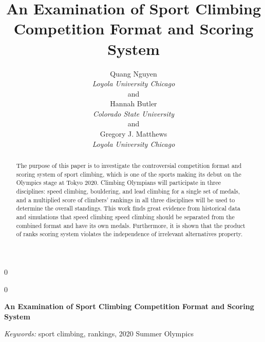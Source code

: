 \documentclass[12pt]{article}
\newcommand{\blind}{0}
\begin{document}
\def\spacingset#1{\renewcommand{\baselinestretch}%
{#1}\small\normalsize} \spacingset{1}



\blind
{
  \title{\bf An Examination of Sport Climbing Competition Format and
Scoring System}

  \author{
        Quang Nguyen \\
    \textit{Loyola University Chicago}\\
     and \\     Hannah Butler \\
    \textit{Colorado State University}\\
     and \\     Gregory J. Matthews \\
    \textit{Loyola University Chicago}\\
      }
  \maketitle
} \fi

\blind
{
  \bigskip
  \bigskip
  \bigskip
  \begin{center}
    {\LARGE\bf An Examination of Sport Climbing Competition Format and
Scoring System}
  \end{center}
  \medskip
} \fi

\bigskip
\begin{abstract}
The purpose of this paper is to investigate the controversial
competition format and scoring system of sport climbing, which is one of
the sports making its debut on the Olympics stage at Tokyo 2020.
Climbing Olympians will participate in three disciplines: speed
climbing, bouldering, and lead climbing for a single set of medals, and
a multiplied score of climbers' rankings in all three disciplines will
be used to determine the overall standings. This work finds great
evidence from historical data and simulations that speed climbing speed
climbing should be separated from the combined format and have its own
medals. Furthermore, it is shown that the product of ranks scoring
system violates the independence of irrelevant alternatives property.
\end{abstract}

\noindent%
{\it Keywords:} sport climbing, rankings, 2020 Summer Olympics
\vfill

\newpage
\spacingset{1.45} %
\end{document}
